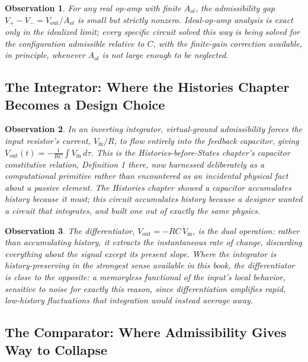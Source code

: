 \documentclass[12pt]{article}
\newtheorem{observation}{Observation}
\begin{document}
\begin{observation}
For any real op-amp with finite $A_{ol}$, the admissibility gap $V_+ - V_- = V_{\text{out}}/A_{ol}$ is small but strictly nonzero. Ideal-op-amp analysis is exact only in the idealized limit; every specific circuit solved this way is being solved for the configuration admissible relative to $C$, with the finite-gain correction available, in principle, whenever $A_{ol}$ is not large enough to be neglected.
\end{observation}

\subsection{The Integrator: Where the Histories Chapter Becomes a Design Choice}

\begin{observation}
In an inverting integrator, virtual-ground admissibility forces the input resistor's current, $V_{\text{in}}/R$, to flow entirely into the feedback capacitor, giving $V_{\text{out}}(t) = -\frac{1}{RC}\int V_{\text{in}}\,d\tau$. This is the Histories-before-States chapter's capacitor constitutive relation, Definition 1 there, now harnessed deliberately as a computational primitive rather than encountered as an incidental physical fact about a passive element. The Histories chapter showed a capacitor accumulates history because it must; this circuit accumulates history because a designer wanted a circuit that integrates, and built one out of exactly the same physics.
\end{observation}

\begin{observation}
The differentiator, $V_{\text{out}} = -RC\,\dot V_{\text{in}}$, is the dual operation: rather than accumulating history, it extracts the instantaneous rate of change, discarding everything about the signal except its present slope. Where the integrator is history-preserving in the strongest sense available in this book, the differentiator is close to the opposite: a memoryless functional of the input's local behavior, sensitive to noise for exactly this reason, since differentiation amplifies rapid, low-history fluctuations that integration would instead average away.
\end{observation}

\subsection{The Comparator: Where Admissibility Gives Way to Collapse}
\end{document}
